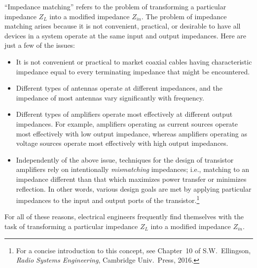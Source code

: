 

\label{m0092_Impedance_Matching_General_Considerations} %

``Impedance matching'' refers to the problem of transforming a particular impedance $Z_L$ into a modified impedance $Z_{in}$.
The problem of impedance matching arises because it is not convenient, practical, or desirable to have all devices in a system operate at the same input and output impedances.  Here are just a few of the issues:
%
\begin{itemize}
\item It is not convenient or practical to market coaxial cables 
having characteristic impedance equal to every terminating impedance that might be encountered.
\item Different types of antennas 
operate at different impedances, and the impedance of most antennas vary significantly with frequency.
\item Different types of amplifiers 
operate most effectively at different output impedances.  For example, amplifiers operating as current sources operate most effectively with low output impedance, whereas amplifiers operating as voltage sources operate most effectively with high output impedances.  
\item Independently of the above issue, techniques for the design of transistor amplifiers rely on intentionally \emph{mismatching} impedances; i.e., matching to an impedance different than that which maximizes power transfer or minimizes reflection.  In other words, various design goals are met by applying particular impedances to the input and output ports of the transistor.\footnote{For a concise introduction to this concept, see Chapter~10 of S.W.\ Ellingson, \emph{Radio Systems Engineering}, Cambridge Univ.\ Press, 2016.}
\end{itemize} 
%
For all of these reasons, electrical engineers frequently find themselves with the task of transforming a particular impedance $Z_L$ into a modified impedance $Z_{in}$.

